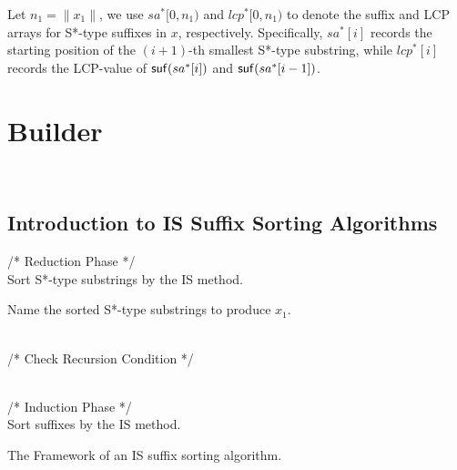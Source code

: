 \documentclass[10pt,journal,compsoc]{IEEEtran}
\begin{document}
Let $n_1 = \|x_1\|$, we use $sa^*[0, n_1)$ and $lcp^*[0, n_1)$ to denote the suffix and LCP arrays for S*-type suffixes in $x$, respectively. Specifically, $sa^*[i]$ records the starting position of the $(i + 1)$-th smallest S*-type substring, while $lcp^*[i]$ records the LCP-value of ${\sf suf}(sa^*[i])$ and ${\sf suf}(sa^*[i - 1])$.


\section{Builder}~\label{sec:builder}

\subsection{Introduction to IS Suffix Sorting Algorithms} \label{subsec:improvement}

\begin{algorithm}
	\SetAlgoNoLine
	
	/* Reduction Phase */ \\
	Sort S*-type substrings by the IS method.
	
	Name the sorted S*-type substrings to produce $x_1$.
	
	~\\
	
	/* Check Recursion Condition */ \\	
	
	~\\
	
	/* Induction Phase */ \\
	Sort suffixes by the IS method.
	
	
	\caption{The Framework of an IS suffix sorting algorithm.}
	
	\label{alg:1}
\end{algorithm}
\end{document}
